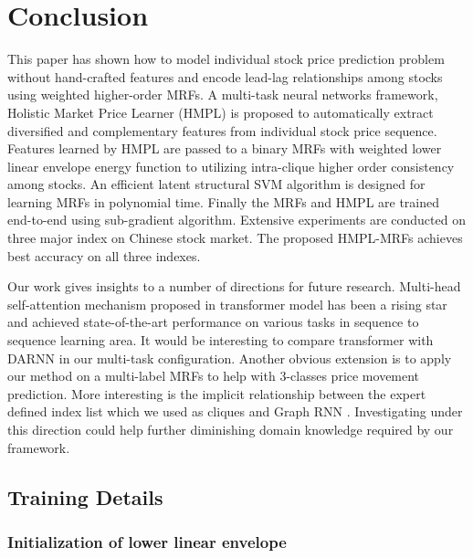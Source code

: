 \documentclass[sigconf,anonymous,review]{acmart}
\renewcommand{\cite}{\citep}
\begin{document}
\section{Conclusion}
\label{sec:conc}

This paper has shown how to model individual stock price
prediction problem without hand-crafted features and encode
lead-lag relationships among stocks using weighted higher-order
MRFs. A multi-task neural networks framework, Holistic Market
Price Learner (HMPL) is proposed to automatically extract
diversified and complementary features from individual stock
price sequence. Features learned by HMPL are passed to a binary
MRFs with weighted lower linear envelope energy function to
utilizing intra-clique higher order consistency among stocks. An
efficient latent structural SVM algorithm is designed for
learning MRFs in polynomial time. Finally the MRFs and HMPL are
trained end-to-end using sub-gradient algorithm. Extensive
experiments are conducted on three major index on Chinese stock
market. The proposed HMPL-MRFs achieves best accuracy on all
three indexes.

Our work gives insights to a number of directions for future
research. Multi-head self-attention mechanism proposed in
transformer model\cite{vaswani2017attention} has been a rising
star and achieved state-of-the-art performance on various tasks
in sequence to sequence learning area. It would be interesting to
compare transformer with DARNN in our multi-task configuration.
Another obvious extension is to apply our method on a multi-label
MRFs to help with 3-classes price movement prediction. More
interesting is the implicit relationship between the expert
defined index list which we used as cliques and Graph RNN
\cite{you2018graphrnn}. Investigating under this direction could
help further diminishing domain knowledge required by our
framework.




%



\appendix

\subsection{Training Details}
\label{sec:train_detail}

\subsubsection{Initialization of lower linear envelope}
\label{sec:sup_init}
\end{document}
